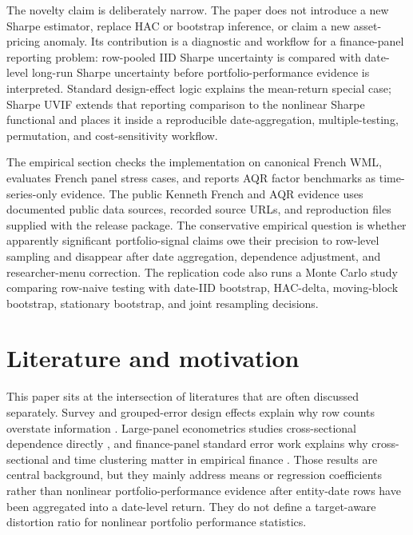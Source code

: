 \documentclass[12pt,a4paper]{article}
\begin{document}
The novelty claim is deliberately narrow.  The paper does not introduce
a new Sharpe estimator, replace HAC or bootstrap inference, or claim a
new asset-pricing anomaly.  Its contribution is a diagnostic and
workflow for a finance-panel reporting problem: row-pooled IID Sharpe
uncertainty is compared with date-level long-run Sharpe uncertainty
before portfolio-performance evidence is interpreted.  Standard
design-effect logic explains the mean-return special case; Sharpe UVIF
extends that reporting comparison to the nonlinear Sharpe functional and
places it inside a reproducible date-aggregation, multiple-testing,
permutation, and cost-sensitivity workflow.

The empirical section checks the implementation on canonical French
WML, evaluates French panel stress cases, and reports AQR factor
benchmarks as time-series-only evidence.  The public Kenneth French and
AQR evidence uses documented public data sources, recorded source URLs,
and reproduction files supplied with the release package.
The conservative empirical question is whether apparently significant
portfolio-signal claims owe their precision to row-level sampling and
disappear after date aggregation, dependence adjustment, and
researcher-menu correction.
The replication code also runs a Monte Carlo study comparing row-naive
testing with date-IID bootstrap, HAC-delta, moving-block bootstrap,
stationary bootstrap, and joint resampling decisions.

\section{Literature and motivation}

This paper sits at the intersection of literatures that are often
discussed separately.  Survey and grouped-error design effects explain
why row counts overstate information
\citep{kish1965survey,moulton1986random}.  Large-panel econometrics
studies cross-sectional dependence directly
\citep{chudik2015large}, and finance-panel standard error work explains
why cross-sectional and time clustering matter in empirical finance
\citep{petersen2009estimating}.  Those results are central background,
but they mainly address means or regression coefficients rather than
nonlinear portfolio-performance evidence after entity-date rows have
been aggregated into a date-level return.  They do not define a
target-aware distortion ratio for nonlinear portfolio performance
statistics.
\end{document}
